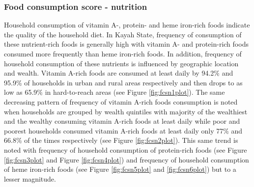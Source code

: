 \documentclass[12pt,a4paper]{article}
\begin{document}
\newpage

\hypertarget{fcsn-results}{%
\subsubsection{Food consumption score - nutrition}\label{fcsn-results}}

Household consumption of vitamin A-, protein- and heme iron-rich foods indicate the quality of the household diet. In Kayah State, frequency of consumption of these nutrient-rich foods is generally high with vitamin A- and protein-rich foods consumed more frequently than heme iron-rich foods. In addition, frequency of household consumption of these nutrients is influenced by geographic location and wealth. Vitamin A-rich foods are consumed at least daily by 94.2\% and 95.9\% of households in urban and rural areas respectively and then drops to as low as 65.9\% in hard-to-reach areas (see Figure \ref{fig:fcsn1plot}). The same decreasing pattern of frequency of vitamin A-rich foods consumption is noted when households are grouped by wealth quintiles with majority of the wealthiest and the wealthy consuming vitamin A-rich foods at least daily while poor and poorest households consumed vitamin A-rich foods at least daily only 77\% and 66.8\% of the times respectively (see Figure \ref{fig:fcsn2plot}). This same trend is noted with frequency of household consumption of protein-rich foods (see Figure \ref{fig:fcsn3plot} and Figure \ref{fig:fcsn4plot}) and frequency of household consumption of heme iron-rich foods (see Figure \ref{fig:fcsn5plot} and \ref{fig:fcsn6plot}) but to a lesser magnitude.
\end{document}
